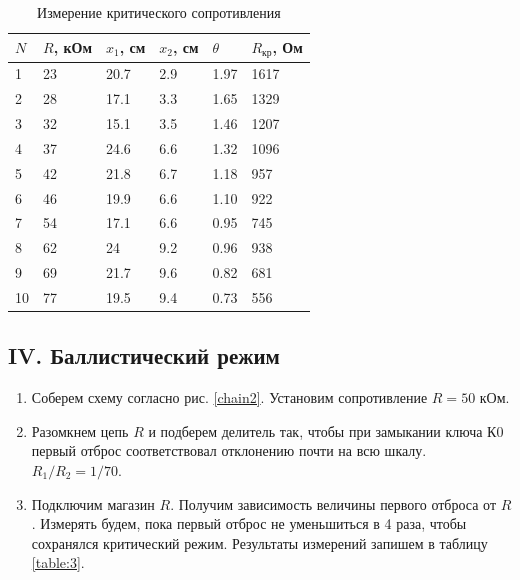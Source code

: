 \documentclass[a4paper,12pt]{article}
\begin{document}
\FloatBarrier
\begin{table}[!h]
    \centering
    \caption{Измерение критического сопротивления}
    \begin{tabular}{|l|l|l|l|l|l|}
        \hline
        $N$  & $R$, кОм & $x_1$, см   & $x_2$, см  & $\theta$ & $R_\text{кр}$, Ом \\ \hline
        1  & 23     & 20.7 & 2.9 & 1.97                  & 1617  \\ \hline
        2  & 28     & 17.1 & 3.3 & 1.65                  & 1329  \\ \hline
        3  & 32     & 15.1 & 3.5 & 1.46                  & 1207  \\ \hline
        4  & 37     & 24.6 & 6.6 & 1.32                  & 1096  \\ \hline
        5  & 42     & 21.8 & 6.7 & 1.18                  & 957   \\ \hline
        6  & 46     & 19.9 & 6.6 & 1.10                  & 922   \\ \hline
        7  & 54     & 17.1 & 6.6 & 0.95                  & 745   \\ \hline
        8  & 62     & 24   & 9.2 & 0.96                  & 938   \\ \hline
        9  & 69     & 21.7 & 9.6 & 0.82                  & 681   \\ \hline
        10 & 77     & 19.5 & 9.4 & 0.73                  & 556   \\ \hline
    \end{tabular}
    \label{table:2}
\end{table}

\subsection*{IV. Баллистический режим}

\begin{enumerate}[resume]
    \item Соберем схему согласно рис. \ref{chain2}. Установим сопротивление $R = 50$ кОм.
    \item Разомкнем цепь $R$ и подберем делитель так, чтобы при замыкании ключа К0 первый отброс соответствовал отклонению почти на всю шкалу. $R_1/R_2 = 1/70$.
    \item Подключим магазин $R$. Получим зависимость величины первого отброса от $R$. Измерять будем, пока первый отброс не уменьшиться в 4 раза, чтобы сохранялся критический режим. Результаты измерений запишем в таблицу \ref{table:3}.
\end{enumerate}
\end{document}
